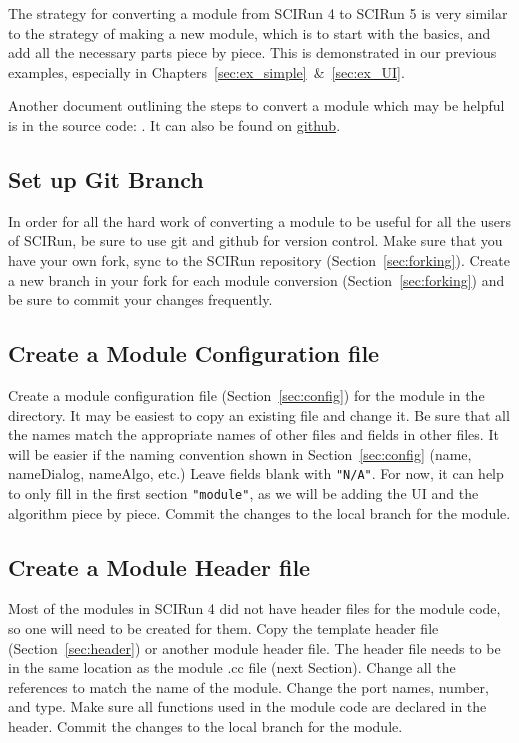 \documentclass[fleqn,11pt,openany]{book}
\begin{document}
The strategy for converting a module from SCIRun 4 to SCIRun 5 is very similar to the strategy of making a new module, which is to start with the basics, and add all the necessary parts piece by piece.  
This is demonstrated in our previous examples, especially in Chapters~\ref{sec:ex_simple}~\&~\ref{sec:ex_UI}.

Another document outlining the steps to convert a module which may be helpful is in the source code: \emph{}.
It can also be found on \href{https://github.com/SCIInstitute/SCIRun/blob/master/src/Documentation/Manuals/ModuleConversionSteps.md}{github}.

\subsection{Set up Git Branch}

In order for all the hard work of converting a module to be useful for all the users of SCIRun, be sure to use git and github for version control.  Make sure that you have your own fork, sync to the SCIRun repository (Section~\ref{sec:forking}).  
Create a new branch in your fork for each module conversion (Section~\ref{sec:forking}) and be sure to commit your changes frequently.  

\subsection{Create a Module Configuration file}

Create a module configuration file (Section~\ref{sec:config}) for the module in the \emph{} directory.  
It may be easiest to copy an existing file and change it.
Be sure that all the names match the appropriate names of other files and fields in other files.
It will be easier if the naming convention shown in Section~\ref{sec:config} (name, nameDialog, nameAlgo, etc.)
Leave fields blank with \verb|"N/A"|.
For now, it can help to only fill in the first section \verb|"module"|, as we will be adding the UI and the algorithm piece by piece.  
Commit the changes to the local branch for the module.

\subsection{Create a Module Header file}

Most of the modules in SCIRun 4 did not have header files for the module code, so one will need to be created for them.  
Copy the template header file (Section~\ref{sec:header}) or another module header file.  
The header file needs to be in the same location as the module .cc file (next Section).
Change all the references to match the name of the module.
Change the port names, number, and type.
Make sure all functions used in the module code are declared in the header.  
Commit the changes to the local branch for the module.
\end{document}
